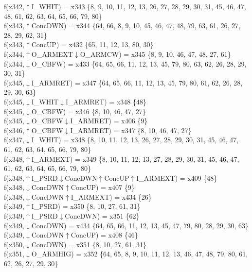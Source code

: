 f(x342,$\uparrow$I\_WHIT) = x343 \{8, 9, 10, 11, 12, 13, 26, 27, 28, 29, 30, 31, 45, 46, 47, 48, 61, 62, 63, 64, 65, 66, 79, 80\} \\  
f(x343,$\uparrow$ConcDWN) = x344 \{64, 66, 8, 9, 10, 45, 46, 47, 48, 79, 63, 61, 26, 27, 28, 29, 62, 31\} \\  
f(x343,$\uparrow$ConcUP) = x432 \{65, 11, 12, 13, 80, 30\} \\  
f(x344,$\uparrow$O\_ARMEXT$\downarrow$O\_ARMCW) = x345 \{8, 9, 10, 46, 47, 48, 27, 61\} \\  
f(x344,$\downarrow$O\_CBFW) = x433 \{64, 65, 66, 11, 12, 13, 45, 79, 80, 63, 62, 26, 28, 29, 30, 31\} \\  
f(x345,$\downarrow$I\_ARMRET) = x347 \{64, 65, 66, 11, 12, 13, 45, 79, 80, 61, 62, 26, 28, 29, 30, 63\} \\  
f(x345,$\downarrow$I\_WHIT$\downarrow$I\_ARMRET) = x348 \{48\} \\  
f(x345,$\downarrow$O\_CBFW) = x346 \{8, 10, 46, 47, 27\} \\  
f(x345,$\downarrow$O\_CBFW$\downarrow$I\_ARMRET) = x406 \{9\} \\  
f(x346,$\uparrow$O\_CBFW$\downarrow$I\_ARMRET) = x347 \{8, 10, 46, 47, 27\} \\  
f(x347,$\downarrow$I\_WHIT) = x348 \{8, 10, 11, 12, 13, 26, 27, 28, 29, 30, 31, 45, 46, 47, 61, 62, 63, 64, 65, 66, 79, 80\} \\  
f(x348,$\uparrow$I\_ARMEXT) = x349 \{8, 10, 11, 12, 13, 27, 28, 29, 30, 31, 45, 46, 47, 61, 62, 63, 64, 65, 66, 79, 80\} \\  
f(x348,$\uparrow$I\_PSRD$\downarrow$ConcDWN$\uparrow$ConcUP$\uparrow$I\_ARMEXT) = x409 \{48\} \\  
f(x348,$\downarrow$ConcDWN$\uparrow$ConcUP) = x407 \{9\} \\  
f(x348,$\downarrow$ConcDWN$\uparrow$I\_ARMEXT) = x434 \{26\} \\  
f(x349,$\uparrow$I\_PSRD) = x350 \{8, 10, 27, 61, 31\} \\  
f(x349,$\uparrow$I\_PSRD$\downarrow$ConcDWN) = x351 \{62\} \\  
f(x349,$\downarrow$ConcDWN) = x434 \{64, 65, 66, 11, 12, 13, 45, 47, 79, 80, 28, 29, 30, 63\} \\  
f(x349,$\downarrow$ConcDWN$\uparrow$ConcUP) = x408 \{46\} \\  
f(x350,$\downarrow$ConcDWN) = x351 \{8, 10, 27, 61, 31\} \\  
f(x351,$\downarrow$O\_ARMHIG) = x352 \{64, 65, 8, 9, 10, 11, 12, 13, 46, 47, 48, 79, 80, 61, 62, 26, 27, 29, 30\} \\  
